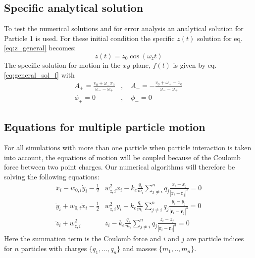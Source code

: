 \documentclass[english,notitlepage,reprint,nofootinbib]{revtex4-1}  %
\begin{document}
\subsection*{Specific analytical solution}
To test the numerical solutions and for error analysis an analytical solution for
Particle 1 is used. For these initial condition the specific $z(t)$ solution for
eq. \ref{eq:z_general} becomes:
\begin{equation*}
    z(t) = z_0 \cos(\omega_z t)
\end{equation*}
The specific solution for motion in the $xy$-plane, $f(t)$ is given by eq. \ref{eq:general_sol_f}
with
\begin{align*}
    A_+ = \frac{v_0 + \omega_- x_0}{\omega_- - \omega_+}&, \quad A_- = -\frac{v_0 + \omega_+- x_0}{\omega_- - \omega_+} \\
    \phi_+ = 0&, \quad \phi_- = 0
\end{align*}


\subsection*{Equations for multiple particle motion}
For all simulations with more than one particle when particle interaction is taken into account,
the equations of motion will be coupled because of the Coulomb force between two point charges.
Our numerical algorithms will therefore be solving the following equations:
\begin{align}
    \ddot{x}_i - w_{0,i} \dot{y}_i - \frac{1}{2} & w_{z,i}^2 x_i - k_e \frac{q_i}{m_i} \sum_{j\neq i}^{n} q_j \frac{x_i - x_j}{|\textbf{r}_i - \textbf{r}_j|^3} = 0 \label{eq:a_x_coupled} \\
    \ddot{y}_i + w_{0,i} \dot{x}_i - \frac{1}{2} & w_{z,i}^2 y_i - k_e \frac{q_i}{m_i} \sum_{j\neq i}^{n} q_j \frac{y_i - y_j}{|\textbf{r}_i - \textbf{r}_j|^3} = 0 \label{eq:a_y_coupled} \\
    \ddot{z}_i + w_{z,i}^2                       & z_i - k_e \frac{q_i}{m_i} \sum_{j\neq i}^{n} q_j \frac{z_i - z_j}{|\textbf{r}_i - \textbf{r}_j|^3} = 0 \label{eq:a_z_coupled}
\end{align}
Here the summation term is the Coulomb force and $i$ and $j$ are particle indices for $n$ particles
with charges $\{q_1,...,q_n\}$ and masses $\{m_1,..,m_n\}$.
\end{document}
